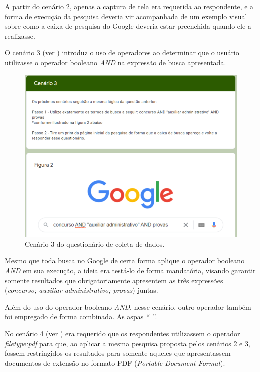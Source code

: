 \documentclass[portuguese]{textolivre}
\begin{document}
A partir do cenário 2, apenas a captura de tela era requerida ao respondente, e a forma de execução da pesquisa deveria vir acompanhada de um exemplo visual sobre como a caixa de pesquisa do Google deveria estar preenchida quando ele a realizasse.

O cenário 3 (ver ) introduz o uso de operadores ao determinar que o usuário utilizasse o operador booleano \textit{AND} na expressão de busca apresentada.

\begin{figure}[h!]
    \centering
    \includegraphics[width=0.8\linewidth]{fig-006.png}
    \caption{Cenário 3 do questionário de coleta de dados.}
    \label{fig6}
\end{figure}

Mesmo que toda busca no Google de certa forma aplique o operador booleano \textit{AND} em sua execução, a ideia era testá-lo de forma mandatória, visando garantir somente resultados que obrigatoriamente apresentem as três expressões (\textit{concurso; auxiliar administrativo; provas}) juntas.

Além do uso do operador booleano \textit{AND}, nesse cenário, outro operador também foi empregado de forma combinada. As aspas \textit{“ ”}.

No cenário 4 (ver ) era requerido que os respondentes utilizassem o operador \textit{filetype:pdf} para que, ao aplicar a mesma pesquisa proposta pelos cenários 2 e 3, fossem restringidos os resultados para somente aqueles que apresentassem documentos de extensão no formato PDF (\textit{Portable Document Format}).
\end{document}
